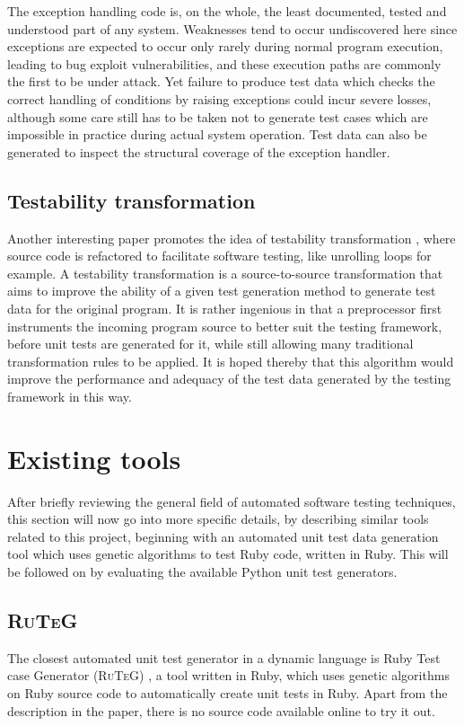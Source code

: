 \documentclass{icldt}
\numberwithin{equation}{section}       %
\begin{document}
The exception handling code is, on the whole, the least documented, tested and understood part of any system. Weaknesses tend to occur undiscovered here since exceptions are expected to occur only rarely during normal program execution, leading to bug exploit vulnerabilities, and these execution paths are commonly the first to be under attack. Yet failure to produce test data which checks the correct handling of conditions by raising exceptions could incur severe losses, although some care still has to be taken not to generate test cases which are impossible in practice during actual system operation. Test data can also be generated to inspect the structural coverage of the exception handler.

\subsection{Testability transformation}
Another interesting paper promotes the idea of testability transformation \cite{Korel2005}, where source code is refactored to facilitate software testing, like unrolling loops for example. A testability transformation is a source-to-source transformation that aims to improve the ability of a given test generation method to generate test data for the original program. It is rather ingenious in that a preprocessor first instruments the incoming program source to better suit the testing framework, before unit tests are generated for it, while still allowing many traditional transformation rules to be applied. It is hoped thereby that this algorithm would improve the performance and adequacy of the test data generated by the testing framework in this way.

\section{Existing tools}
\label{sect:current-state}
After briefly reviewing the general field of automated software testing techniques, this section will now go into more specific details, by describing similar tools related to this project, beginning with an automated unit test data generation tool which uses genetic algorithms to test Ruby code, written in Ruby. This will be followed on by evaluating the available Python unit test generators.

\subsection{\textsc{RuTeG}}
The closest automated unit test generator in a dynamic language is Ruby Test case Generator (\textsc{RuTeG}) \cite{Mairhofer2011}, a tool written in Ruby, which uses genetic algorithms on Ruby source code to automatically create unit tests in Ruby. Apart from the description in the paper, there is no source code available online to try it out.
\end{document}
